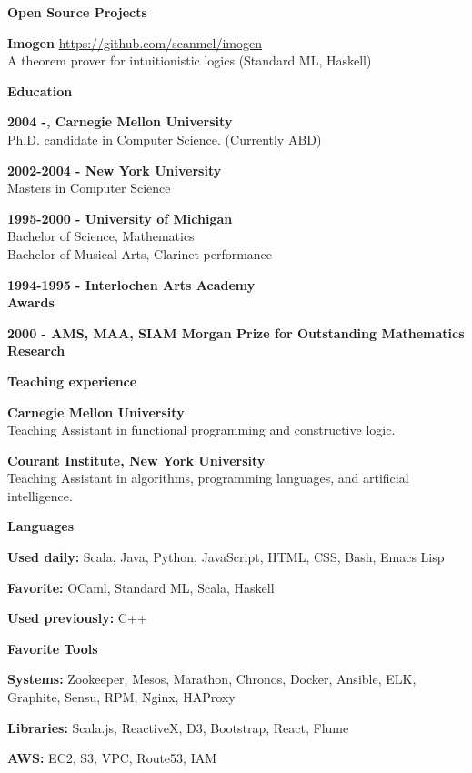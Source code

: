 \documentclass[a4paper,12pt,final]{memoir}
\newcommand{\SmallSep}{\vspace{0.5em}}
\newcommand{\CVSection}[1]
{\Large\textbf{#1}\par
  \SmallSep\normalsize\normalfont}
\newcommand{\CVItem}[1]
{\textbf{\color{RoyalBlue} #1}}
\newcommand{\CPP}{C\hspace{-2pt}+\hspace{-4pt}+}
\begin{document}
\CVSection{Open Source Projects}
\CVItem{Imogen} \url{https://github.com/seanmcl/imogen}\\
A theorem prover for intuitionistic logics (Standard ML, Haskell)

\SmallSep

\CVSection{Education}
\CVItem{2004 -, Carnegie Mellon University}\\
Ph.D. candidate in Computer Science.  (Currently ABD)
\SmallSep

\CVItem{2002-2004 - New York University}\\
Masters in Computer Science
\SmallSep

\CVItem{1995-2000 - University of Michigan}\\
Bachelor of Science, Mathematics \\
Bachelor of Musical Arts, Clarinet performance \\
\SmallSep

\CVItem{1994-1995 - Interlochen Arts Academy}\\

\CVSection{Awards}
\CVItem{2000 - AMS, MAA, SIAM Morgan Prize for Outstanding Mathematics Research}
\SmallSep

\CVSection{Teaching experience}

\CVItem{Carnegie Mellon University}\\
Teaching Assistant in functional programming and constructive logic.
\SmallSep

\CVItem{Courant Institute, New York University}\\
Teaching Assistant in algorithms, programming languages, and
artificial intelligence.
\SmallSep

\CVSection{Languages}

\CVItem{Used daily: }
Scala, Java, Python, JavaScript, HTML, CSS, Bash, Emacs Lisp
\SmallSep

\CVItem{Favorite:} OCaml, Standard ML, Scala, Haskell
\SmallSep

\CVItem{Used previously:} \CPP
\SmallSep

\CVSection{Favorite Tools}

\CVItem{Systems: }
Zookeeper, Mesos, Marathon, Chronos, Docker, Ansible, ELK, Graphite,
Sensu, RPM, Nginx, HAProxy
\SmallSep

\CVItem{Libraries: }
Scala.js, ReactiveX, D3, Bootstrap, React, Flume
\SmallSep

\CVItem{AWS: }
EC2, S3, VPC, Route53, IAM
\SmallSep
\end{document}
